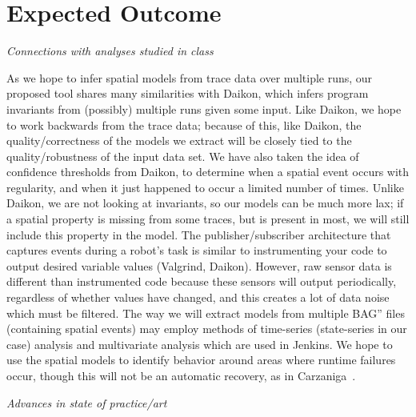 \section{Expected Outcome} 

\emph{Connections with analyses studied in class}

As we hope to infer spatial models from trace data over multiple runs, our proposed tool shares many similarities with Daikon, which infers program invariants from (possibly) multiple runs given some input.
Like Daikon, we hope to work backwards from the trace data; because of this, like Daikon, the quality/correctness of the models we extract will be closely tied to the quality/robustness of the input data set.
We have also taken the idea of confidence thresholds from Daikon, to determine when a spatial event occurs with regularity, and when it just happened to occur a limited number of times.
Unlike Daikon, we are not looking at invariants, so our models can be much more lax; if a spatial property is missing from some traces, but is present in most, we will still include this property in the model.
The publisher/subscriber architecture that captures events during a robot's task is similar to instrumenting your code to output desired variable values (Valgrind, Daikon).
However, raw sensor data is different than instrumented code because these sensors will output periodically, regardless of whether values have changed, and this creates a lot of data noise which must be filtered.
The way we will extract models from multiple BAG'' files (containing spatial events) may employ methods of time-series (state-series in our case) analysis and multivariate analysis which are used in Jenkins.  
We hope to use the spatial models to identify behavior around areas where runtime failures occur, though this will not be an automatic recovery, as in Carzaniga~\etal.

\emph{Advances in state of practice/art}
